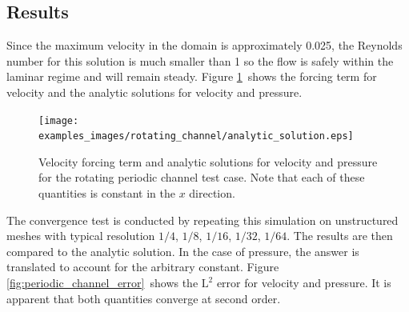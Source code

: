 \subsection{Results}

Since the maximum velocity in the domain is approximately 0.025, the
Reynolds number for this solution is much smaller than 1 so the flow is
safely within the laminar regime and will remain steady. Figure
\ref{fig:periodic_channel}\ shows the forcing term for velocity and the
analytic solutions for velocity and pressure.


\begin{figure}[htbp]
  \centering
  \onlypdf{\begin{pdfdisplay}}
    \texttt{[image: examples\_images/rotating\_channel/analytic\_solution.eps]}
  \onlypdf{\end{pdfdisplay}}
  \caption{Velocity forcing term and analytic solutions for velocity and
    pressure for the rotating periodic channel test case. Note that each of
    these quantities is constant in the $x$ direction.}
  \label{fig:periodic_channel}
\end{figure}

The convergence test is conducted by repeating this simulation on unstructured meshes
with typical resolution $1/4$, $1/8$, $1/16$, $1/32$, $1/64$. The results
are then compared to the analytic solution. In the case of pressure, the
answer is translated to account for the arbitrary constant. Figure
\ref{fig:periodic_channel_error}\ shows the $\textrm{L}^2$ error for
velocity and pressure. It is apparent that both quantities converge at
second order.

